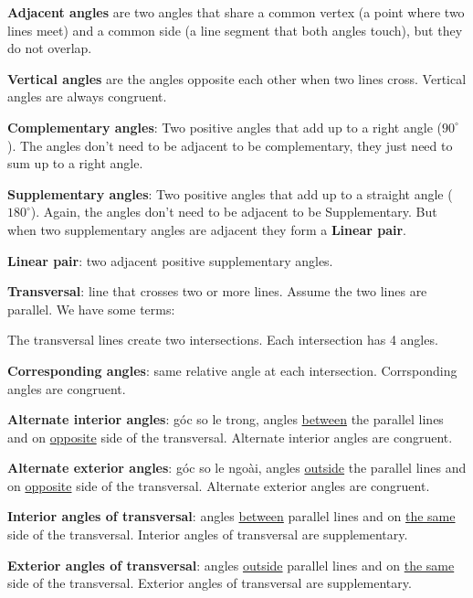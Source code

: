 \textbf{Adjacent angles} are two angles that share a common vertex (a point where two lines meet) and a common side (a line segment that both angles touch), but they do not overlap.

\textbf{Vertical angles} are the angles opposite each other when two lines cross. Vertical angles are always congruent.

\textbf{Complementary angles}: Two positive angles that add up to a right angle ($90^{\circ}$). The angles don't need to be adjacent to be complementary, they just need to sum up to a right angle.

\textbf{Supplementary angles}: Two positive angles that add up to a straight angle ($180^{\circ}$). Again, the angles don't need to be adjacent to be Supplementary. But when two supplementary angles are adjacent they form a \textbf{Linear pair}.

\textbf{Linear pair}: two adjacent positive supplementary angles.

\textbf{Transversal}: line that crosses two or more lines. Assume the two lines are parallel. We have some terms:

The transversal lines create two intersections. Each intersection has 4 angles.

\textbf{Corresponding angles}: same relative angle at each intersection. Corrsponding angles are congruent.

\textbf{Alternate interior angles}: góc so le trong, angles \underline{between} the parallel lines and on \underline{opposite} side of the transversal. Alternate interior angles are congruent.

\textbf{Alternate exterior angles}: góc so le ngoài, angles \underline{outside} the parallel lines and on \underline{opposite} side of the transversal. Alternate exterior angles are congruent.

\textbf{Interior angles of transversal}: angles \underline{between} parallel lines and on \underline{the same} side of the transversal. Interior angles of transversal are supplementary.

\textbf{Exterior angles of transversal}: angles \underline{outside} parallel lines and on \underline{the same} side of the transversal. Exterior angles of transversal are supplementary.
